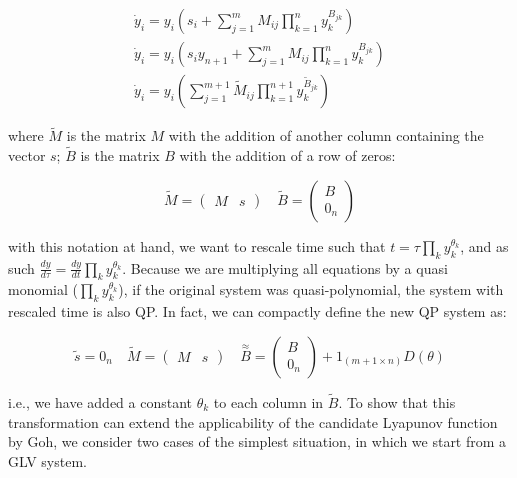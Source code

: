 \documentclass{article}
\begin{document}
\begin{equation}
\label{eq:qpextra}
\begin{aligned}
\dot{y}_i = y_i \left( s_i + \sum_{j = 1}^m M_{ij} \prod_{k = 1}^n y_k^{B_{jk}} \right)\\
\dot{y}_i = y_i \left( s_i y_{n+1} + \sum_{j = 1}^m M_{ij} \prod_{k = 1}^n y_k^{B_{jk}} \right)\\
\dot{y}_i = y_i \left(\sum_{j = 1}^{m+1} \tilde{M}_{ij} \prod_{k = 1}^{n+1} y_k^{\tilde{B}_{jk}} \right)
\end{aligned}
\end{equation}

\noindent where \(\tilde{M}\) is the matrix \(M\) with the addition of
another column containing the vector \(s\); \(\tilde{B}\) is the matrix
\(B\) with the addition of a row of zeros:

\begin{equation}
\tilde{M} = \left(\begin{array}{c|c} 
M & s
\end{array}
\right) \quad \tilde{B} = \left( \begin{array}{c} B \\ \hline 0_n \end{array} \right)
\end{equation}

with this notation at hand, we want to rescale time such that
\(t = \tau \prod_{k} y_k^{\theta_k}\), and as such
\(\frac{d y}{d\tau} = \frac{d y}{d t} \prod_{k} y_k^{\theta_k}\).
Because we are multiplying all equations by a quasi monomial
(\(\prod_{k} y_k^{\theta_k}\)), if the original system was
quasi-polynomial, the system with rescaled time is also QP. In fact, we
can compactly define the new QP system as:

\begin{equation}
\tilde{s} = 0_{n} \quad \tilde{M} = \left(\begin{array}{c|c} 
M & s
\end{array} \right) \quad 
\overset{\approx}{B} =  \left( \begin{array}{c} B \\ \hline 0_n \end{array} \right) + 1_{(m+1 \times n)} D(\theta)
\end{equation}

i.e., we have added a constant \(\theta_k\) to each column in
\(\tilde{B}\). To show that this transformation can extend the
applicability of the candidate Lyapunov function by Goh, we consider two
cases of the simplest situation, in which we start from a GLV system.
\end{document}
